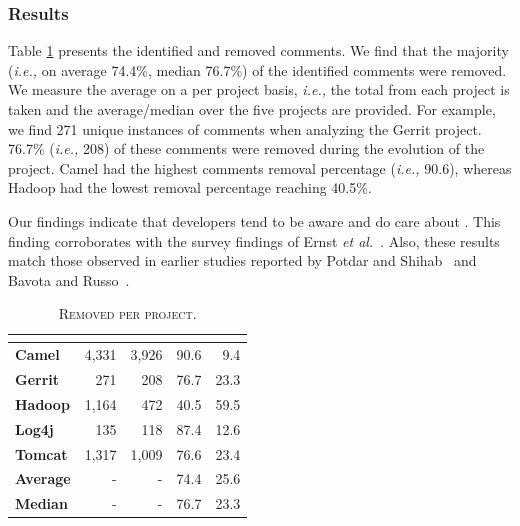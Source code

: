 \subsubsection*{Results} Table \ref{tbl:removed_self_admitted_technical_debt_per_project} presents the identified and removed \SATD comments. We find that the majority (\textit{i.e.,} on average 74.4\%, median 76.7\%) of the identified \SATD comments were removed. We measure the average on a per project basis, \textit{i.e.,} the total from each project is taken and the average/median over the five projects are provided. For example, we find 271 unique instances of \SATD comments when analyzing the Gerrit project. 76.7\% (\textit{i.e.,} 208) of these \SATD comments were removed during the evolution of the project. Camel had the highest \SATD comments removal percentage (\textit{i.e.,} 90.6), whereas Hadoop had the lowest removal percentage reaching 40.5\%. 

Our findings indicate that developers tend to be aware and do care about \SATD. This finding corroborates with the survey findings of Ernst \emph{et al.}~\cite{Ernst2015FSE}. Also, these results match those observed in earlier studies reported by Potdar and Shihab~\cite{Potdar2014ICSME} and Bavota and Russo~\cite{Bavota2016MSR}.

\begin{table}[!t]
	\begin{center}
		\caption{\textsc{Removed \SATD per project.}}
		\label{tbl:removed_self_admitted_technical_debt_per_project}
		\begin{tabular}{l|rrrr}
			\toprule
			\textbf{\thead{Project}} & \textbf{\thead{\#identified}} & \textbf{\thead{\#removed}} & \textbf{\thead{\% removed}} &  \textbf{\thead{\% remains}}  \\ 
			\midrule
			\textbf{Camel }  &  4,331  & 3,926  & 90.6  & 9.4\\
			\textbf{Gerrit}  &  271    & 208    & 76.7 & 23.3 \\
			\textbf{Hadoop}  &  1,164  & 472    & 40.5 & 59.5 \\  
			\textbf{Log4j }  &  135    & 118    & 87.4 & 12.6\\ 
			\textbf{Tomcat}  &  1,317  & 1,009  & 76.6 & 23.4\\   
			\midrule
			\textbf{Average} & -       & -      & 74.4 & 25.6\\
			\textbf{Median} & -       & -      & 76.7 & 23.3\\
			\bottomrule
		\end{tabular}
	\end{center}    
\end{table}





